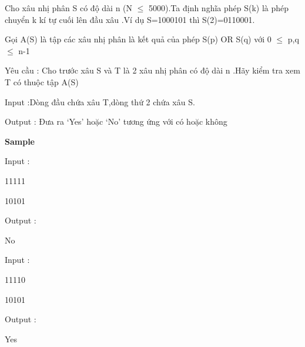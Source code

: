 





   Cho xâu nhị phân S có độ dài n (N $\le$ 5000).Ta định nghĩa phép S(k) là phép chuyển k kí tự cuối lên đầu xâu .Ví dụ S=1000101 thì S(2)=0110001.  

   Gọi A(S) là tập các xâu nhị phân là kết quả của phép S(p) OR S(q) với 0 $\le$ p,q $\le$ n-1  

   Yêu cầu : Cho trước xâu S và T là 2 xâu nhị phân có độ dài n .Hãy kiểm tra xem T có thuộc tập A(S)  

   Input :Dòng đầu chứa xâu T,dòng thứ 2 chứa xâu S.  

   Output : Đưa ra ‘Yes’ hoặc ‘No’ tương ứng với có hoặc không  

\textbf{     Sample    }

       Input :     

   11111  

   10101  

       Output :     

   No  



       Input :     

   11110  

   10101  

       Output :     

   Yes  



